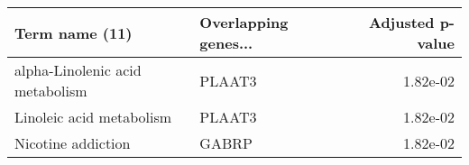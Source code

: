 \begin{tabular}{llr}
\toprule
                 Term name (11) & Overlapping genes... &  Adjusted p-value \\
\midrule
alpha-Linolenic acid metabolism &               PLAAT3 &          1.82e-02 \\
       Linoleic acid metabolism &               PLAAT3 &          1.82e-02 \\
             Nicotine addiction &                GABRP &          1.82e-02 \\
\bottomrule
\end{tabular}
